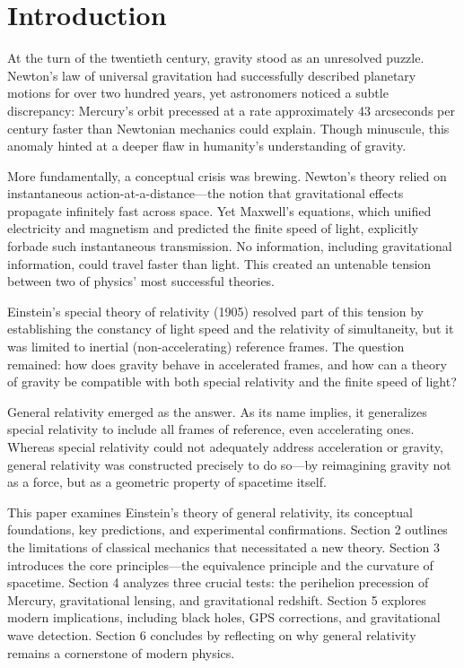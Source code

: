 \documentclass[12pt, a4paper]{article}
\begin{document}
	\tableofcontents
	
	\pagebreak
	
	\section{Introduction}
	
	At the turn of the twentieth century, gravity stood as an unresolved puzzle. Newton's law of universal gravitation had successfully described planetary motions for over two hundred years, yet astronomers noticed a subtle discrepancy: Mercury's orbit precessed at a rate approximately 43 arcseconds per century faster than Newtonian mechanics could explain. Though minuscule, this anomaly hinted at a deeper flaw in humanity's understanding of gravity.
	
	More fundamentally, a conceptual crisis was brewing. Newton's theory relied on instantaneous action-at-a-distance---the notion that gravitational effects propagate infinitely fast across space. Yet Maxwell's equations, which unified electricity and magnetism and predicted the finite speed of light, explicitly forbade such instantaneous transmission. No information, including gravitational information, could travel faster than light. This created an untenable tension between two of physics' most successful theories.
	
	Einstein's special theory of relativity (1905) resolved part of this tension by establishing the constancy of light speed and the relativity of simultaneity, but it was limited to inertial (non-accelerating) reference frames. The question remained: how does gravity behave in accelerated frames, and how can a theory of gravity be compatible with both special relativity and the finite speed of light? 
	
	General relativity emerged as the answer. As its name implies, it generalizes special relativity to include all frames of reference, even accelerating ones. Whereas special relativity could not adequately address acceleration or gravity, general relativity was constructed precisely to do so---by reimagining gravity not as a force, but as a geometric property of spacetime itself.
	
	This paper examines Einstein's theory of general relativity, its conceptual foundations, key predictions, and experimental confirmations. Section 2 outlines the limitations of classical mechanics that necessitated a new theory. Section 3 introduces the core principles---the equivalence principle and the curvature of spacetime. Section 4 analyzes three crucial tests: the perihelion precession of Mercury, gravitational lensing, and gravitational redshift. Section 5 explores modern implications, including black holes, GPS corrections, and gravitational wave detection. Section 6 concludes by reflecting on why general relativity remains a cornerstone of modern physics.
	
\end{document}
